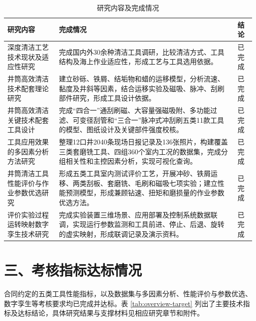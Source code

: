 \begin{table}[H]
	\centering
	\caption{研究内容及完成情况}
	\label{tab:overview-content}
	\footnotesize
	\renewcommand{\arraystretch}{1.3}
	\begin{tabularx}{\textwidth}{@{}>{\raggedright\arraybackslash}p{3.4cm}>{\raggedright\arraybackslash}X>{\centering\arraybackslash}p{1.5cm}@{}}
		\toprule
		研究内容 & 完成情况 & 结论 \\
		\midrule
		深度清洁工艺技术现状及适应性研究 & 完成国内外30余种清洁工具调研，比较清洁方式、工具结构及海上作业适应性，形成工艺与工具选用依据。 & 已完成 \\
		井筒高效清洁技术配套理论研究 & 建立砂砾、铁屑、结垢物和蜡的运移模型，分析流速、黏度及井斜等因素，结合运移实验及磁吸、脉冲、刮刷部件研究，形成工具设计依据。 & 已完成 \\
		井筒高效清洁关键技术配套工具设计 & 完成“四合一”通刮刷磁、大容量强磁吸附、多功能过滤、可变径刮管和“三合一”脉冲式冲刮刷五类11款工具的模型、图纸设计及关键部件强度校核。 & 已完成 \\
		工具应用效果的多因素分析方法研究 & 整理12口井2040条现场日报记录及136张照片，构建覆盖三类套磨铣工具、四组360个室内工况的数据集，完成分组相关性和主控因素分析，实现可视化查询。 & 已完成 \\
		井筒清洁工具性能评价与作业参数优选研究 & 形成五类工具室内测试评价工艺，开展冲砂、铁屑运移、两类刮板、套磨铣、毛刷和磁吸七项实验；建立性能预测模型，形成兼顾钻速、扭矩和磨损量的作业参数优选方法。 & 已完成 \\
		评价实验过程运转映射数字孪生技术研究 & 完成实验装置三维场景、应用部署及控制系统数据联调，实现运行参数监测和工具前进、停止、后退、旋转的虚实映射，形成联调记录及演示资料。 & 已完成 \\
		\bottomrule
	\end{tabularx}
\end{table}

\section*{三、考核指标达标情况}

合同约定的五类工具性能指标，以及数据集与多因素分析、性能评价与参数优选、数字孪生等考核要求均已完成并达标。表 \ref{tab:overview-target} 列出了主要技术指标及达标结论，具体研究结果与支撑材料见相应研究章节和附件。

